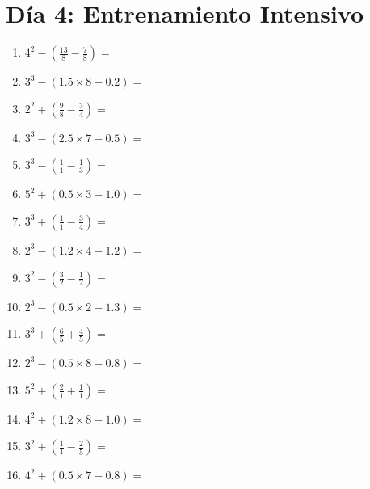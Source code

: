 \documentclass[12pt]{article}
\begin{document}
\section*{Día 4: Entrenamiento Intensivo}
\begin{enumerate}
\item \large $ 4^{2} - (\frac{13}{8} - \frac{7}{8}) = $ \vspace{1.6cm}
\item \large $ 3^{3} - (1.5 \times 8 - 0.2) = $ \vspace{1.6cm}
\item \large $ 2^{2} + (\frac{9}{8} - \frac{3}{4}) = $ \vspace{1.6cm}
\item \large $ 3^{3} - (2.5 \times 7 - 0.5) = $ \vspace{1.6cm}
\item \large $ 3^{3} - (\frac{1}{1} - \frac{1}{3}) = $ \vspace{1.6cm}
\item \large $ 5^{2} + (0.5 \times 3 - 1.0) = $ \vspace{1.6cm}
\item \large $ 3^{3} + (\frac{1}{1} - \frac{3}{4}) = $ \vspace{1.6cm}
\item \large $ 2^{3} - (1.2 \times 4 - 1.2) = $ \vspace{1.6cm}
\item \large $ 3^{2} - (\frac{3}{2} - \frac{1}{2}) = $ \vspace{1.6cm}
\item \large $ 2^{3} - (0.5 \times 2 - 1.3) = $ \vspace{1.6cm}
\newpage
\item \large $ 3^{3} + (\frac{6}{5} + \frac{4}{5}) = $ \vspace{1.6cm}
\item \large $ 2^{3} - (0.5 \times 8 - 0.8) = $ \vspace{1.6cm}
\item \large $ 5^{2} + (\frac{2}{1} + \frac{1}{1}) = $ \vspace{1.6cm}
\item \large $ 4^{2} + (1.2 \times 8 - 1.0) = $ \vspace{1.6cm}
\item \large $ 3^{2} + (\frac{1}{1} - \frac{2}{5}) = $ \vspace{1.6cm}
\item \large $ 4^{2} + (0.5 \times 7 - 0.8) = $ \vspace{1.6cm}

\end{enumerate}
\end{document}
